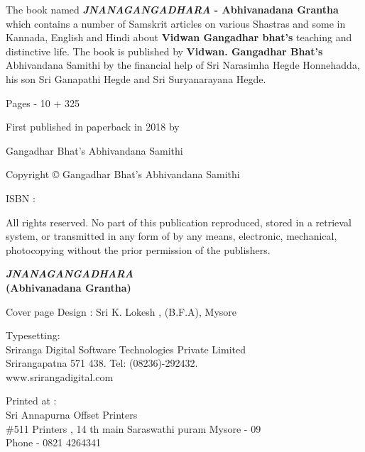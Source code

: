 \thispagestyle{empty}
{\fontsize{10}{12}\selectfont

The book named \textbf{\emph{JNANAGANGADHARA }- Abhivanadana Grantha} which contains a number of Samskrit articles on various Shastras and some in Kannada, English and Hindi about \textbf{Vidwan Gangadhar bhat’s} teaching and  distinctive life. The book is published by \textbf{Vidwan. Gangadhar Bhat’s} Abhivandana Samithi by the financial help of Sri Narasimha Hegde Honnehadda, his son Sri Ganapathi Hegde and Sri Suryanarayana Hegde.

\begin{flushleft}

\bigskip
Pages - 10 + 325

First published in paperback in 2018 by

Gangadhar Bhat’s Abhivandana Samithi

Copyright © Gangadhar Bhat’s Abhivandana Samithi

\bigskip
ISBN :

\bigskip
All rights reserved. No part of this publication reproduced, stored in a retrieval system, or transmitted in any form of by any means, electronic, mechanical, photocopying without the prior permission of the publishers.
\vfill
\begin{center}
\textbf{{\Large \emph{JNANAGANGADHARA}}\\
(Abhivanadana Grantha)}
\end{center}
\vfill
 
 
 
 
 
 
 
 
  
\bigskip
Cover page Design : Sri K. Lokesh , (B.F.A), Mysore

\bigskip
\noindent
Typesetting:\\ 
{\selectfont Sriranga Digital Software Technologies Private Limited}\\ 
Srirangapatna 571 438. Tel: (08236)-292432.\\
www.srirangadigital.com
\vfill

\bigskip
Printed at :\\
Sri Annapurna Offset Printers\\
\#511 Printers , 14 th main Saraswathi puram Mysore - 09\\
Phone - 0821 4264341

\end{flushleft}

}
